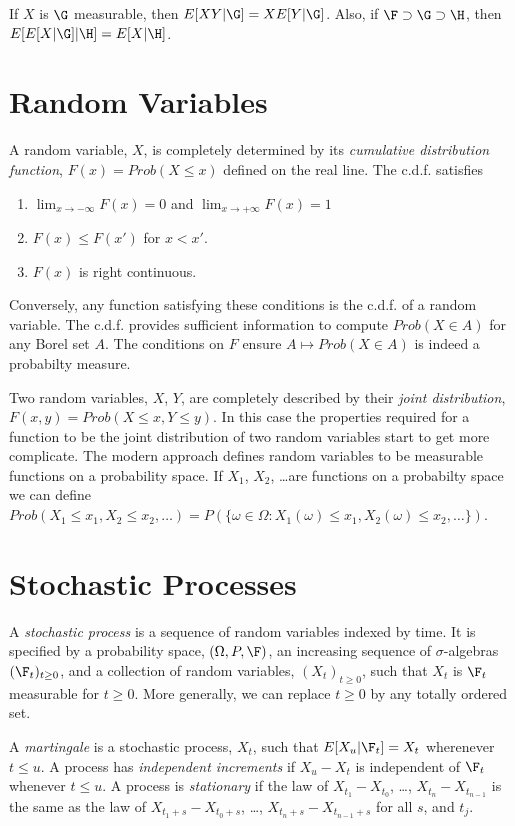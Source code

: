 If $X$ is $\G$ measurable, then $E[XY|\G] = X E[Y|\G]$. Also, if 
$\F\supset\G\supset\H$, then $E[E[X|\G]|\H] = E[X|\H]$.

\section{Random Variables}
A random variable, $X$, is completely determined by its {\em cumulative distribution
function}, $F(x) = Prob(X\le x)$ defined on the real line. The c.d.f. satisfies
\begin{enumerate}
\item $\lim_{x\to-\infty} F(x) = 0$ and $\lim_{x\to+\infty} F(x) = 1$
\item $F(x) \le F(x')$ for $x < x'$.
\item $F(x)$ is right continuous.
\end{enumerate}
Conversely, any function satisfying these conditions is the c.d.f. of
a random variable.
The c.d.f. provides sufficient
information to compute $Prob(X\in A)$ for any Borel set $A$. The conditions
on $F$ ensure $A\mapsto Prob(X\in A)$ is indeed a probabilty measure.

Two random variables, $X$, $Y$, are completely described by their 
{\em joint distribution}, $F(x, y) = Prob(X\le x, Y\le y)$. In this
case the properties required for a function to be the joint distribution
of two random variables start to get more complicate. The modern approach
defines random variables to be measurable functions on a 
probability space. 
If $X_1$, $X_2$, \dots are functions on a probabilty space we
can define $Prob(X_1\le x_1, X_2\le x_2, \dots) = P(\{\omega\in\Omega:
X_1(\omega)\le x_1, X_2(\omega)\le x_2, \dots\})$.

\section{Stochastic Processes}
\label{pt-sp}
A {\em stochastic process} is a sequence of random variables indexed by time.
It is specified by a probability space, $(\Omega, P, \F)$, an increasing sequence
of $\sigma$-algebras $(\F_t)_{t\ge0}$, and a collection 
of random variables, $(X_t)_{t\ge0}$,
such that $X_t$ is $\F_t$ measurable for $t\ge0$. More generally, we can
replace $t\ge0$ by any totally ordered set.

A {\em martingale} is a stochastic process, $X_t$, such that $E[X_u|\F_t] = X_t$
wherenever $t \le u$. A process has {\em independent increments} if
$X_u - X_t$ is independent of $\F_t$ whenever $t\le u$. A process is
{\em stationary} if the law of $X_{t_1} - X_{t_0}$, \dots, $X_{t_n} - X_{t_{n-1}}$
is the same as the law of $X_{t_1 + s} - X_{t_0 + s}$, \dots, $X_{t_n + s} - X_{t_{n-1} + s}$
for all $s$, and $t_j$.

